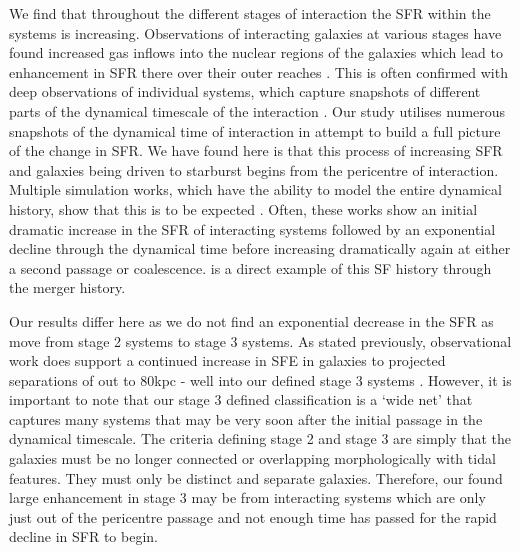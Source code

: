 We find that throughout the different stages of interaction the SFR within the systems is increasing. Observations of interacting galaxies at various stages have found increased gas inflows into the nuclear regions of the galaxies which lead to enhancement in SFR there over their outer reaches \citep{2015A&A...579A..45B}. This is often confirmed with deep observations of individual systems, which capture snapshots of different parts of the dynamical timescale of the interaction \citep{2022MNRAS.514.2769K}. Our study utilises numerous snapshots of the dynamical time of interaction in attempt to build a full picture of the change in SFR. We have found here is that this process of increasing SFR and galaxies being driven to starburst begins from the pericentre of interaction. Multiple simulation works, which have the ability to model the entire dynamical history, show that this is to be expected \citep{2007A&A...468...61D, 2013MNRAS.430.1901H, 2015MNRAS.452.2984K, 2021MNRAS.503.3113M}. Often, these works show an initial dramatic increase in the SFR of interacting systems followed by an exponential decline through the dynamical time before increasing dramatically again at either a second passage or coalescence. \citet{2015MNRAS.448.1107M} is a direct example of this SF history through the merger history.

Our results differ here as we do not find an exponential decrease in the SFR as move from stage 2 systems to stage 3 systems. As stated previously, observational work does support a continued increase in SFE in galaxies to projected separations of out to 80kpc - well into our defined stage 3 systems \citep[for further examples, see][]{2008MNRAS.385.1903L, 2012MNRAS.426..549S}. However, it is important to note that our stage 3 defined classification is a `wide net' that captures many systems that may be very soon after the initial passage in the dynamical timescale. The criteria defining stage 2 and stage 3 are simply that the galaxies must be no longer connected or overlapping morphologically with tidal features. They must only be distinct and separate galaxies. Therefore, our found large enhancement in stage 3 may be from interacting systems which are only just out of the pericentre passage and not enough time has passed for the rapid decline in SFR to begin. 

